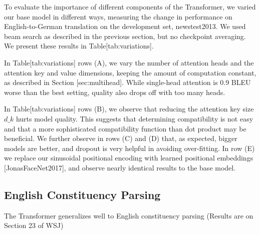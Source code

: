 \documentclass[11pt,a4paper]{article}
\begin{document}
To evaluate the importance of different components of the Transformer, we varied our base model in different ways, measuring the change in performance on English-to-German translation on the development set, newstest2013. We used beam search as described in the previous section, but no checkpoint averaging.  We present these results in Table[tab:variations].

In Table[tab:variations] rows (A), we vary the number of attention heads and the attention key and value dimensions, keeping the amount of computation constant, as described in Section [sec:multihead]. While single-head attention is 0.9 BLEU worse than the best setting, quality also drops off with too many heads.

In Table[tab:variations] rows (B), we observe that reducing the attention key size $d\_k$ hurts model quality. This suggests that determining compatibility is not easy and that a more sophisticated compatibility function than dot product may be beneficial. We further observe in rows (C) and (D) that, as expected, bigger models are better, and dropout is very helpful in avoiding over-fitting.  In row (E) we replace our sinusoidal positional encoding with learned positional embeddings [JonasFaceNet2017], and observe nearly identical results to the base model.

\subsection{English Constituency Parsing}

The Transformer generalizes well to English constituency parsing (Results are on Section 23 of WSJ)
\end{document}
